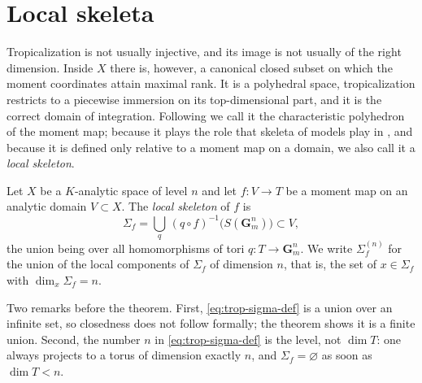 \section{Local skeleta}
\label{sec:trop-local-skeleta}

Tropicalization is not usually injective, and its image is not usually of the
right dimension. Inside $X$ there is, however, a canonical closed subset on
which the moment coordinates attain maximal rank. It is a polyhedral space,
tropicalization restricts to a piecewise immersion on its top-dimensional
part, and it is the correct domain of integration. Following
\cite[\S12.6]{CLD25} we call it the characteristic polyhedron of the moment
map; because it plays the role that skeleta of models play in
, and because it is defined only relative to a moment map
on a domain, we also call it a \emph{local skeleton}.

\begin{definition}
\label{def:trop-local-skeleton}
Let $X$ be a $K$-analytic space of level $n$ and let $f:V\to T$ be a moment
map on an analytic domain $V\subset X$. The \emph{local skeleton} of $f$ is
\begin{equation}
\label{eq:trop-sigma-def}
 \Sigma_f=\bigcup_q\,(q\circ f)^{-1}\bigl(S(\mathbf G_{m}^n)\bigr)
 \subset V,
\end{equation}
the union being over all homomorphisms of tori $q:T\to\mathbf G_{m}^n$. We
write $\Sigma_f^{(n)}$ for the union of the local components of $\Sigma_f$ of
dimension $n$, that is, the set of $x\in\Sigma_f$ with
$\dim_x\Sigma_f=n$.
\end{definition}

Two remarks before the theorem. First, \eqref{eq:trop-sigma-def} is a union
over an infinite set, so closedness does not follow formally; the theorem shows it is
a finite union. Second, the number $n$ in \eqref{eq:trop-sigma-def} is the
level, not $\dim T$: one always projects to a torus of dimension exactly $n$,
and $\Sigma_f=\varnothing$ as soon as $\dim T<n$.

